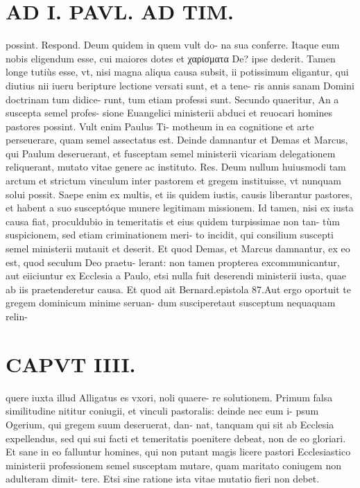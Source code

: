 \documentclass{article}
\begin{document}
\begin{pages}
\section*{AD I. PAVL. AD TIM. }
\marginpar{[ p.202 ]}\pstart possint. Respond. Deum quidem in quem vult do- na sua conferre. Itaque eum nobis eligendum esse, cui maiores dotes et χαρίσματα De? ipse dederit. Tamen longe tutiùs esse, vt, nisi magna aliqua causa subsit, ii potissimum eligantur, qui diutius nii iueru beripture lectione versati sunt, et a tene- ris annis sanam Domini doctrinam tum didice- runt, tum etiam professi sunt.  \pend\pstart Secundo quaeritur, An a suscepta semel profes- sione Euangelici ministerii abduci et reuocari homines pastores possint. Vult enim Paulus Ti- motheum in ea cognitione et arte perseuerare, quam semel assectatus est. Deinde damnantur et Demas et Marcus, qui Paulum deseruerant, et fusceptam semel ministerii vicariam delegationem reliquerant, mutato vitae genere ac instituto. Res. Deum nullum huiusmodi tam arctum et strictum vinculum inter pastorem et gregem instituisse, vt nunquam solui possit. Saepe enim ex multis, et iis quidem iustis, causis liberantur pastores, et habent a suo susceptóque munere legitimam missionem. Id tamen, nisi ex iusta causa fiat, proculdubio in temeritatis et eius quidem turpissimae non tan- tùm suspicionem, sed etiam criminationem meri- to incidit, qui consilium suscepti semel ministerii mutauit et deserit. Et quod Demas, et Marcus damnantur, ex eo est, quod seculum Deo praetu- lerant: non tamen propterea excommunicantur, aut eiiciuntur ex Ecclesia a Paulo, etsi nulla fuit deserendi ministerii iusta, quae ab iis praetenderetur causa. Et quod ait Bernard.epistola 87.Aut ergo oportuit te gregem dominicum minime seruan- dum susciperetaut susceptum nequaquam relin-  \pend
\section*{CAPVT  IIII. }
\marginpar{[ p.203 ]}\pstart quere iuxta illud Alligatus es vxori, noli quaere- re solutionem. Primum falsa similitudine nititur coniugii, et vinculi pastoralis: deinde nec eum i- psum Ogerium, qui gregem suum deseruerat, dan- nat, tanquam qui sit ab Ecclesia expellendus, sed qui sui facti et temeritatis poenitere debeat, non de eo gloriari. Et sane in eo falluntur homines, qui non putant magis licere pastori Ecclesiastico ministerii professionem semel susceptam mutare, quam maritato coniugem non adulteram dimit- tere. Etsi sine ratione ista vitae mutatio fieri non debet.  \pend
{}
{}

\end{pages}
\end{document}
